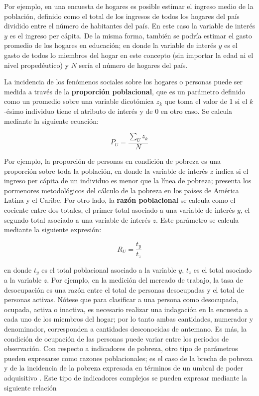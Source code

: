 Por ejemplo, en una encuesta de hogares es posible estimar el ingreso medio de la población, definido como el total de los ingresos de todos los hogares del país dividido entre el número de habitantes del país. En este caso la variable de interés \(y\) es el ingreso per cápita. De la misma forma, también se podría estimar el gasto promedio de los hogares en educación; en donde la variable de interés \(y\) es el gasto de todos lo miembros del hogar en este concepto (sin importar la edad ni el nivel propedéutico) y \(N\) sería el número de hogares del país.

La incidencia de los fenómenos sociales sobre los hogares o personas puede ser medida a través de la \textbf{proporción poblacional}, que es un parámetro definido como un promedio sobre una variable dicotómica \(z_k\) que toma el valor de 1 si el \(k\)-ésimo individuo tiene el atributo de interés y de 0 en otro caso. Se calcula mediante la siguiente ecuación:

\[P_U=\frac{\sum_U z_k}{N}\]

Por ejemplo, la proporción de personas en condición de pobreza es una proporción sobre toda la población, en donde la variable de interés \(z\) indica si el ingreso per cápita de un individuo es menor que la línea de pobreza; \citet{CEPAL_2018} presenta los pormenores metodológicos del cálculo de la pobreza en los países de América Latina y el Caribe. Por otro lado, la \textbf{razón poblacional} se calcula como el cociente entre dos totales, el primer total asociado a una variable de interés \(y\), el segundo total asociado a una variable de interés \(z\). Este parámetro se calcula mediante la siguiente expresión:

\[R_U=\frac{t_y}{t_z}\]

en donde \(t_y\) es el total poblacional asociado a la variable \(y\), \(t_z\) es el total asociado a la variable \(z\). Por ejemplo, en la medición del mercado de trabajo, la tasa de desocupación es una razón entre el total de personas desocupadas y el total de personas activas. Nótese que para clasificar a una persona como desocupada, ocupada, activa o inactiva, es necesario realizar una indagación en la encuesta a cada uno de los miembros del hogar; por lo tanto ambas cantidades, numerador y denominador, corresponden a cantidades desconocidas de antemano. Es más, la condición de ocupación de las personas puede variar entre los periodos de observación. Con respecto a indicadores de pobreza, otro tipo de parámetros pueden expresarse como razones poblacionales; es el caso de la brecha de pobreza y de la incidencia de la pobreza expresada en términos de un umbral de poder adquisitivo \citep{Foster_Greer_Thorbecke_1984}. Este tipo de indicadores complejos se pueden expresar mediante la siguiente relación

